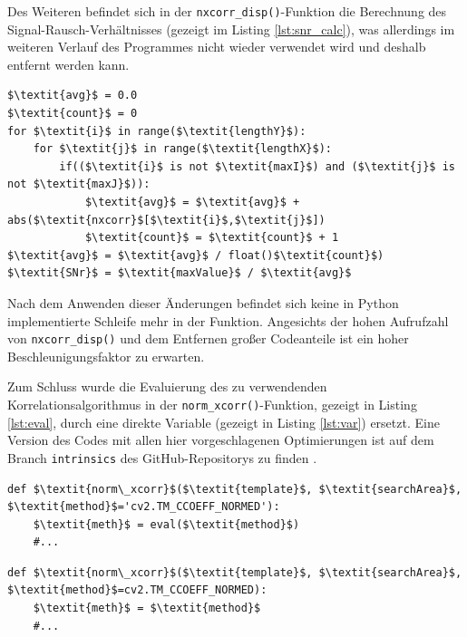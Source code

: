 \begin{sloppypar}
	Des Weiteren befindet sich in der \texttt{nxcorr\_disp()}-Funktion die Berechnung des Signal-Rausch-Verhältnisses (gezeigt im Listing \ref{lst:snr_calc}), was allerdings im weiteren Verlauf des Programmes nicht wieder verwendet wird und deshalb entfernt werden kann. 
\end{sloppypar}

\begin{lstlisting}[caption={Berechnung des Signal-Rausch-Verhältnisses}, label={lst:snr_calc}]
$\textit{avg}$ = 0.0
$\textit{count}$ = 0
for $\textit{i}$ in range($\textit{lengthY}$):
	for $\textit{j}$ in range($\textit{lengthX}$):
		if(($\textit{i}$ is not $\textit{maxI}$) and ($\textit{j}$ is not $\textit{maxJ}$)):
			$\textit{avg}$ = $\textit{avg}$ + abs($\textit{nxcorr}$[$\textit{i}$,$\textit{j}$])
			$\textit{count}$ = $\textit{count}$ + 1
$\textit{avg}$ = $\textit{avg}$ / float()$\textit{count}$)
$\textit{SNr}$ = $\textit{maxValue}$ / $\textit{avg}$
\end{lstlisting}

Nach dem Anwenden dieser Änderungen befindet sich keine in Python implementierte Schleife mehr in der Funktion. Angesichts der hohen Aufrufzahl von \texttt{nxcorr\_disp()} und dem Entfernen großer Codeanteile ist ein hoher Beschleunigungsfaktor zu erwarten. 

Zum Schluss wurde die Evaluierung des zu verwendenden Korrelationsalgorithmus in der \texttt{norm\_xcorr()}-Funktion, gezeigt in Listing \ref{lst:eval}, durch eine direkte Variable (gezeigt in Listing \ref{lst:var}) ersetzt. Eine Version des Codes mit allen hier vorgeschlagenen Optimierungen ist auf dem Branch \texttt{intrinsics} des GitHub-Repositorys zu finden \cite{CBS18}. 

\begin{lstlisting}[caption={Evaluierung der Korellationsmethode}, label={lst:eval}]
def $\textit{norm\_xcorr}$($\textit{template}$, $\textit{searchArea}$, $\textit{method}$='cv2.TM_CCOEFF_NORMED'):
	$\textit{meth}$ = eval($\textit{method}$)
	#...
\end{lstlisting}

\begin{lstlisting}[caption={Übergabe der Korellationsmethode als Variable}, label={lst:var}]
def $\textit{norm\_xcorr}$($\textit{template}$, $\textit{searchArea}$, $\textit{method}$=cv2.TM_CCOEFF_NORMED):
	$\textit{meth}$ = $\textit{method}$
	#...
\end{lstlisting}

